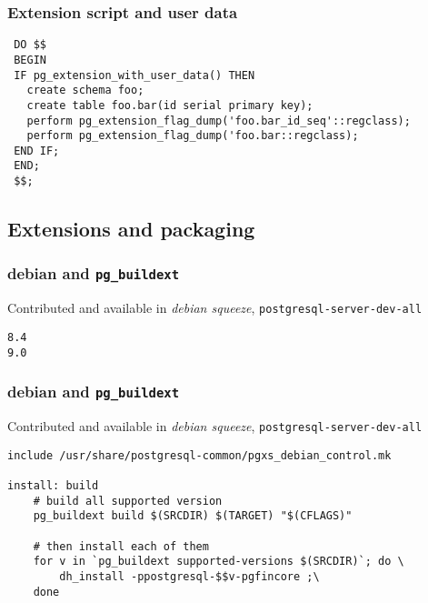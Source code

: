 \documentclass[english]{beamer}
\begin{document}
\begin{frame}[fragile]
  \frametitle{Extension script and user data}

  \begin{example}
\begin{verbatim}
 DO $$
 BEGIN
 IF pg_extension_with_user_data() THEN
   create schema foo;
   create table foo.bar(id serial primary key);
   perform pg_extension_flag_dump('foo.bar_id_seq'::regclass);
   perform pg_extension_flag_dump('foo.bar::regclass);
 END IF;
 END;
 $$;
\end{verbatim}
  \end{example}  
\end{frame}

\subsection{Extensions and packaging}

\begin{frame}[fragile]
  \frametitle{debian and \texttt{pg\_buildext}}

  Contributed and available in \textit{debian squeeze},
  \texttt{postgresql-server-dev-all}
  \linebreak

  \begin{example}
\begin{verbatim}
8.4
9.0
\end{verbatim}
  \end{example}
\end{frame}

\begin{frame}[fragile]
  \frametitle{debian and \texttt{pg\_buildext}}

  Contributed and available in \textit{debian squeeze},
  \texttt{postgresql-server-dev-all}
  \linebreak

  \begin{example}
\begin{verbatim}
include /usr/share/postgresql-common/pgxs_debian_control.mk

install: build
	# build all supported version
	pg_buildext build $(SRCDIR) $(TARGET) "$(CFLAGS)"

	# then install each of them
	for v in `pg_buildext supported-versions $(SRCDIR)`; do \
		dh_install -ppostgresql-$$v-pgfincore ;\
	done
\end{verbatim}
  \end{example}
\end{frame}
\end{document}
